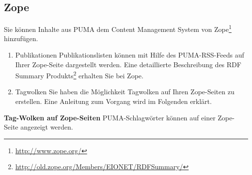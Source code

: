\subsection{Zope}
\label{subsec:zope}
Sie können Inhalte aus PUMA dem Content Management System von Zope\footnote{\url{http://www.zope.org/}} hinzufügen.
\begin{enumerate}
    \item Publikationen\newline
    Publikationslisten können mit Hilfe des PUMA-RSS-Feeds auf Ihrer Zope-Seite dargestellt werden. Eine detaillierte Beschreibung des RDF Summary Produkts\footnote{\url{http://old.zope.org/Members/EIONET/RDFSummary/}} erhalten Sie bei Zope.
    \item Tagwolken\newline
    Sie haben die Möglichkeit Tagwolken auf Ihren Zope-Seiten zu  erstellen. Eine Anleitung zum Vorgang wird im Folgenden erklärt.
\end{enumerate}
\textbf{Tag-Wolken auf Zope-Seiten} \newline\newline
PUMA-Schlagwörter können auf einer Zope-Seite angezeigt werden. 
